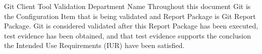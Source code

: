 \documentclass[10pt]{tlc-article}
\begin{document}
  \global\def\configurationitem{Git}

  \tlcTitlePageAndTableOfContents
    {Git Client Tool Validation}
    {Department Name}
    {Throughout this document Git is the Configuration Item that is being
     validated and Report Package is Git Report Package.  Git is
     considered validated after this Report Package has been executed, test
     evidence has been obtained, and that test evidence supports the conclusion
     the Intended Use Requirements (IUR) have been satisfied.}

  
\end{document}
